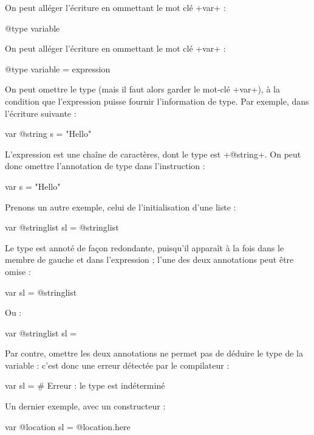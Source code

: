 On peut alléger l'écriture en ommettant le mot clé \ggs+var+ :
\begin{galgas}
@type variable
\end{galgas}




On peut alléger l'écriture en ommettant le mot clé \ggs+var+ :
\begin{galgas}
@type variable = expression
\end{galgas}

On peut omettre le type (mais il faut alors garder le mot-clé \ggs+var+), à la condition que l'expression puisse fournir l'information de type. Par exemple, dans l'écriture suivante :
\begin{galgas}
var @string s = "Hello"
\end{galgas}

L'expression est une chaîne de caractères, dont le type est \ggs+@string+. On peut donc omettre l'annotation de type dans l'instruction :
\begin{galgas}
var s = "Hello"
\end{galgas}


Prenons un autre exemple, celui de l'initialisation d'une liste :
\begin{galgas}
var @stringlist sl = @stringlist {}
\end{galgas}

Le type est annoté de façon redondante, puisqu'il apparaît à la fois dans le membre de gauche et dans l'expression ; l'une des deux annotations peut être omise :
\begin{galgas}
var sl = @stringlist {}
\end{galgas}

Ou :
\begin{galgas}
var @stringlist sl = {}
\end{galgas}

Par contre, omettre les deux annotations ne permet pas de déduire le type de la variable : c'est donc une erreur détectée par le compilateur :
\begin{galgas}
var sl = {} # Erreur : le type est indéterminé
\end{galgas}

Un dernier exemple, avec un constructeur :
\begin{galgas}
var @location sl = @location.here
\end{galgas}

